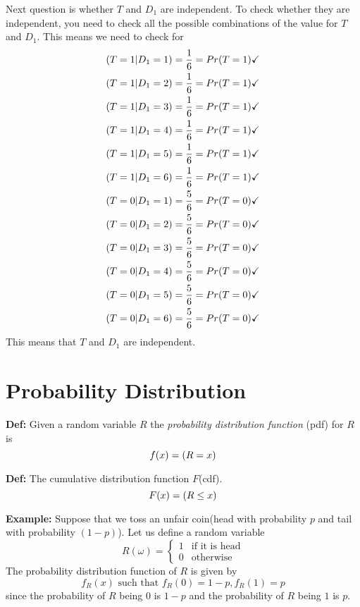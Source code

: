 \documentclass[a4paper, 12pt]{article}
\newcommand{\definition}{\vspace{1em}\noindent\textbf{Def:} }
\newcommand{\example}{\vspace{1em}\noindent\textbf{Example:} }
\let\Pr\relax
\DeclareMathOperator{\Pr}{Pr}
\begin{document}
\begin{multicols}{2}
Next question is whether $T$ and $D_1$ are independent. To check whether they are independent, you need to check all the possible combinations of the value for $T$ and $D_1$. This means we need to check for
\begin{align*}
	\Pr(T=1|D_1=1) = \frac{1}{6} = Pr(T=1) & \checkmark\\
	\Pr(T=1|D_1=2) = \frac{1}{6} = Pr(T=1) & \checkmark\\
	\Pr(T=1|D_1=3) = \frac{1}{6} = Pr(T=1) & \checkmark\\
	\Pr(T=1|D_1=4) = \frac{1}{6} = Pr(T=1) & \checkmark\\
	\Pr(T=1|D_1=5) = \frac{1}{6} = Pr(T=1) & \checkmark\\
	\Pr(T=1|D_1=6) = \frac{1}{6} = Pr(T=1) & \checkmark\\
	\Pr(T=0|D_1=1) = \frac{5}{6} = Pr(T=0) & \checkmark\\
	\Pr(T=0|D_1=2) = \frac{5}{6} = Pr(T=0) & \checkmark\\
	\Pr(T=0|D_1=3) = \frac{5}{6} = Pr(T=0) & \checkmark\\
	\Pr(T=0|D_1=4) = \frac{5}{6} = Pr(T=0) & \checkmark\\
	\Pr(T=0|D_1=5) = \frac{5}{6} = Pr(T=0) & \checkmark\\
	\Pr(T=0|D_1=6) = \frac{5}{6} = Pr(T=0) & \checkmark\\
\end{align*}
This means that $T$ and $D_1$ are independent.

\section*{Probability Distribution}

\definition Given a random variable $R$ the \emph{probability distribution function} (pdf) for $R$ is
\[
	f(x) = \Pr (R=x)
\]

\definition The cumulative distribution function $F$(cdf).
\[
	F(x) = \Pr(R\le x)
\]

\example Suppose that we toss an unfair coin(head with probability $p$ and tail with probability $(1-p)$). Let us define a random variable
\[
	R(\omega) = \begin{cases}
		1 & \text{if it is head}\\
		0 & \text{otherwise}
	\end{cases}
\]
The probability distribution function of $R$ is given by
\[
	f_R(x) \text{ such that } f_R(0) = 1-p, f_R(1)=p
\]
since the probability of $R$ being 0 is $1-p$ and the probability of $R$ being $1$ is $p$.


\end{multicols}
\end{document}
